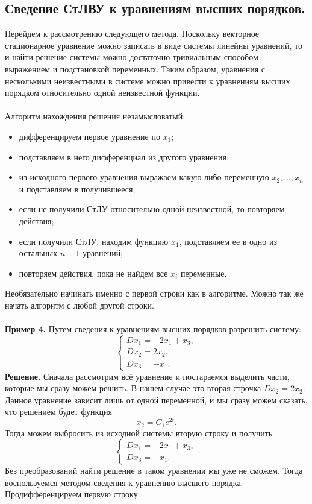 \documentclass[a4paper, 12pt]{article}
\begin{document}
\subsection*{Сведение СтЛВУ к уравнениям высших порядков.}
Перейдем к рассмотрению следующего метода. Поскольку векторное стационарное уравнение можно записать в виде системы линейны уравнений, то и найти решение системы можно достаточно тривиальным способом --- выражением и подстановкой переменных. Таким образом, уравнения с несколькими неизвестными в системе можно привести к уравнениям высших порядком относительно одной неизвестной функции.\\\\
Алгоритм нахождения решения незамысловатый:\begin{itemize}
	\item дифференцируем первое уравнение по $x_1$;
	\item подставляем в него дифференциал из другого уравнения;
	\item из исходного первого уравнения выражаем какую-либо переменную $x_2,\ldots,x_n$ и подставляем в получившееся;
	\item если не получили СтЛУ относительно одной неизвестной, то повторяем действия;
	\item если получили СтЛУ, находим функцию $x_1$, подставляем ее в одно из остальных $n-1$ уравнений;
	\item повторяем действия, пока не найдем все $x_i$ переменные.
\end{itemize}
Необязательно начинать именно с первой строки как в алгоритме. Можно так же начать алгоритм с любой другой строки.\\\\
\textbf{Пример 4.} Путем сведения к уравнениям высших порядков разрешить систему:
$$\begin{cases}
	Dx_1 = -2x_1 + x_3,\\
	Dx_2 = 2x_2 ,\\
	Dx_3 = -x_1.
\end{cases}$$
\textbf{Решение.} Сначала рассмотрим всё уравнение и постараемся выделить части, которые мы сразу можем решить. В нашем случае это вторая строчка $Dx_2 = 2x_2$. Данное уравнение зависит лишь от одной переменной, и мы сразу можем сказать, что решением будет функция $$x_2 = C_1e^{2t}.$$
Тогда можем выбросить из исходной системы вторую строку и получить $$\begin{cases}
	Dx_1 = -2x_1 + x_3,\\
	Dx_3 = -x_1.
\end{cases}$$ Без преобразований найти решение в таком уравнении мы уже не сможем. Тогда воспользуемся методом сведения к уравнению высшего порядка. Продифференцируем первую строку: 
\end{document}
